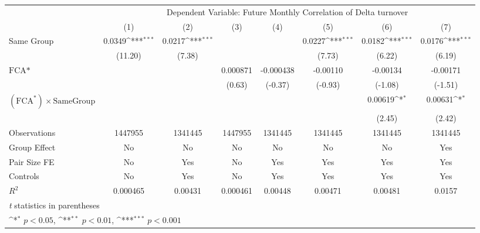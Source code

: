 {
\def\sym#1{\ifmmode^{#1}\else\(^{#1}\)\fi}
\begin{tabular}{l*{7}{c}}
\hline\hline
                &\multicolumn{7}{c}{Dependent Variable: Future Monthly Correlation of Delta turnover}                                                \\\cmidrule(lr){2-8}
                &\multicolumn{1}{c}{(1)}         &\multicolumn{1}{c}{(2)}         &\multicolumn{1}{c}{(3)}         &\multicolumn{1}{c}{(4)}         &\multicolumn{1}{c}{(5)}         &\multicolumn{1}{c}{(6)}         &\multicolumn{1}{c}{(7)}         \\
\hline
Same Group      &   0.0349\sym{***}&   0.0217\sym{***}&                  &                  &   0.0227\sym{***}&   0.0182\sym{***}&   0.0176\sym{***}\\
                &  (11.20)         &   (7.38)         &                  &                  &   (7.73)         &   (6.22)         &   (6.19)         \\
[1em]
$ \text{FCA*} $ &                  &                  & 0.000871         &-0.000438         & -0.00110         & -0.00134         & -0.00171         \\
                &                  &                  &   (0.63)         &  (-0.37)         &  (-0.93)         &  (-1.08)         &  (-1.51)         \\
[1em]
 $ (\text{FCA}^*) \times {\text{SameGroup} }  $ &                  &                  &                  &                  &                  &  0.00619\sym{*}  &  0.00631\sym{*}  \\
                &                  &                  &                  &                  &                  &   (2.45)         &   (2.42)         \\
\hline
Observations    &  1447955         &  1341445         &  1447955         &  1341445         &  1341445         &  1341445         &  1341445         \\
Group Effect    &       No         &       No         &       No         &       No         &       No         &       No         &      Yes         \\
Pair Size FE    &       No         &      Yes         &       No         &      Yes         &      Yes         &      Yes         &      Yes         \\
Controls        &       No         &      Yes         &       No         &      Yes         &      Yes         &      Yes         &      Yes         \\
$ R^2 $         & 0.000465         &  0.00431         & 0.000461         &  0.00448         &  0.00471         &  0.00481         &   0.0157         \\
\hline\hline
\multicolumn{8}{l}{\footnotesize \textit{t} statistics in parentheses}\\
\multicolumn{8}{l}{\footnotesize \sym{*} \(p<0.05\), \sym{**} \(p<0.01\), \sym{***} \(p<0.001\)}\\
\end{tabular}
}
